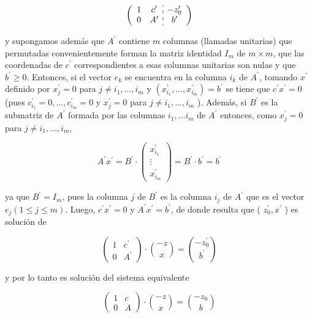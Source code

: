 \documentclass[10pt]{article}
\begin{document}
$$
\left(\begin{array}{cc:c}
1 & c^{\prime} & -z_{0}^{\prime} \\
0 & A^{\prime} & b^{\prime}
\end{array}\right)
$$

y supongamos además que $A^{\prime}$ contiene $m$ columnas (llamadas unitarias) que permutadas convenientemente forman la matriz identidad $I_{m}$ de $m \times m$, que las coordenadas de $c^{\prime}$ correspondientes a esas columnas unitarias son nulas y que $b^{\prime} \geq 0$. Entonces, si el vector $e_{k}$ se encuentra en la columna $i_{k}$ de $A^{\prime}$, tomando $x^{\prime}$ definido por $x_{j}^{\prime}=0$ para $j \neq i_{1}, \ldots, i_{m}$ y $\left(x_{i_{1}}^{\prime}, \ldots, x_{i_{m}}^{\prime}\right)=b^{\prime}$ se tiene que $c^{\prime} x^{\prime}=0$ (pues $c_{i_{1}}^{\prime}=0, \ldots, c_{i_{m}}^{\prime}=0$ y $x_{j}^{\prime}=0$ para $j \neq i_{1}, \ldots, i_{m}$ ). Además, si $B^{\prime}$ es la submatriz de $A^{\prime}$ formada por las columnas $i_{1}, \ldots i_{m}$ de $A^{\prime}$ entonces, como $x_{j}^{\prime}=0$ para $j \neq i_{1}, \ldots, i_{m}$,

$$
A^{\prime} x^{\prime}=B^{\prime} \cdot\left(\begin{array}{c}
x_{i_{1}}^{\prime} \\
\vdots \\
x_{i_{m}}^{\prime}
\end{array}\right)=B^{\prime} \cdot b^{\prime}=b^{\prime}
$$

ya que $B^{\prime}=I_{m}$, pues la columna $j$ de $B^{\prime}$ es la columna $i_{j}$ de $A^{\prime}$ que es el vector $e_{j}(1 \leq j \leq m)$. Luego, $c^{\prime} x^{\prime}=0$ y $A^{\prime} x^{\prime}=b^{\prime}$, de donde resulta que ( $z_{0}^{\prime}, x^{\prime}$ ) es solución de

$$
\left(\begin{array}{cc}
1 & c^{\prime} \\
0 & A^{\prime}
\end{array}\right) \cdot\binom{-z}{x}=\binom{-z_{0}^{\prime}}{b^{\prime}}
$$

y por lo tanto es solución del sistema equivalente

$$
\left(\begin{array}{cc}
1 & c \\
0 & A
\end{array}\right) \cdot\binom{-z}{x}=\binom{-z_{0}}{b}
$$
\end{document}
